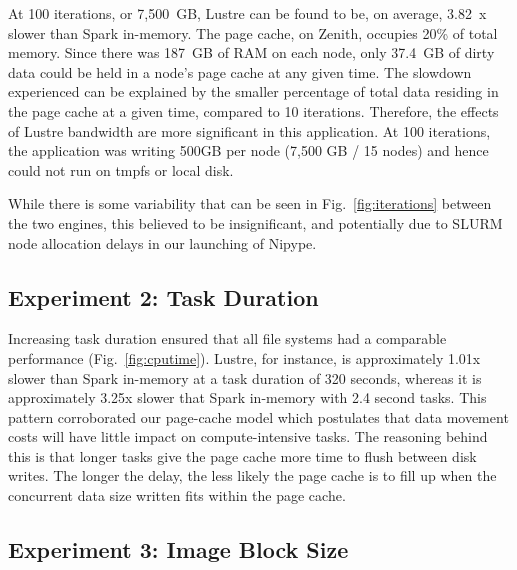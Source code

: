 \documentclass{IEEEtran}
\begin{document}


At 100 iterations, or 7,500~GB, Lustre can be found to be, on average, 3.82~x 
slower than Spark in-memory. The page cache, on Zenith, occupies 20\% of 
total memory. Since there was 187~GB of RAM on each node, only 37.4~GB of 
dirty data could be held in a node's page cache at any given time. The 
slowdown experienced can be explained by the smaller percentage of total data 
residing in the page cache at a given time, compared to 10 iterations. 
Therefore, the effects of Lustre bandwidth are more significant in 
this application. At 100 iterations, the application was writing 500GB 
per node (7,500 GB / 15 nodes) and hence could not run on tmpfs or local disk.

While there is some variability that can be seen in Fig.~\ref{fig:iterations} 
between the two engines, this believed to be insignificant, and potentially due 
to SLURM node allocation delays in our launching of Nipype.


\subsection{Experiment 2: Task Duration}
%

Increasing task duration ensured that all file systems had a comparable performance
(Fig.~\ref{fig:cputime}). Lustre, for instance, is approximately 1.01x slower
than Spark in-memory at a task duration of 320 seconds, whereas it is 
approximately 3.25x slower that Spark in-memory with 2.4 second tasks. This 
pattern corroborated our page-cache model which postulates that 
data movement costs will have little impact on compute-intensive tasks. The 
reasoning behind this is that longer tasks give the page cache more time to flush 
between disk writes. The longer the delay, the less likely the page cache is 
to fill up when the concurrent data size written fits within the page cache.

\subsection{Experiment 3: Image Block Size}
\end{document}
